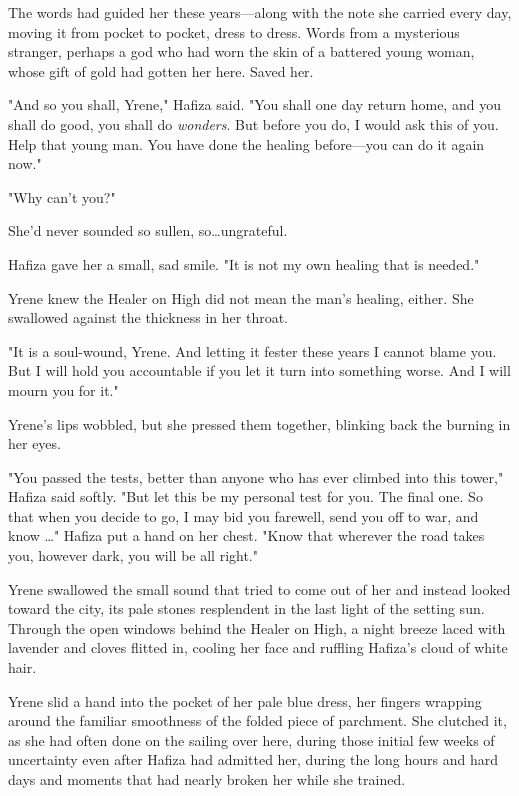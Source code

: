 The words had guided her these years---along with the note she carried every day, moving it from pocket to pocket, dress to dress. Words from a mysterious stranger, perhaps a god who had worn the skin of a battered young woman, whose gift of gold had gotten her here. Saved her.

"And so you shall, Yrene," Hafiza said. "You shall one day return home, and you shall do good, you shall do \emph{wonders}. But before you do, I would ask this of you. Help that young man. You have done the healing before---you can do it again now."

"Why can't you?"

She'd never sounded so sullen, so\ldots ungrateful.

Hafiza gave her a small, sad smile. "It is not my own healing that is needed."

Yrene knew the Healer on High did not mean the man's healing, either. She swallowed against the thickness in her throat.

"It is a soul-wound, Yrene. And letting it fester these years I cannot blame you. But I will hold you accountable if you let it turn into something worse. And I will mourn you for it."

Yrene's lips wobbled, but she pressed them together, blinking back the burning in her eyes.

"You passed the tests, better than anyone who has ever climbed into this tower," Hafiza said softly. "But let this be my personal test for you. The final one. So that when you decide to go, I may bid you farewell, send you off to war, and know \ldots" Hafiza put a hand on her chest. "Know that wherever the road takes you, however dark, you will be all right."

Yrene swallowed the small sound that tried to come out of her and instead looked toward the city, its pale stones resplendent in the last light of the setting sun. Through the open windows behind the Healer on High, a night breeze laced with lavender and cloves flitted in, cooling her face and ruffling Hafiza's cloud of white hair.

Yrene slid a hand into the pocket of her pale blue dress, her fingers wrapping around the familiar smoothness of the folded piece of parchment. She clutched it, as she had often done on the sailing over here, during those initial few weeks of uncertainty even after Hafiza had admitted her, during the long hours and hard days and moments that had nearly broken her while she trained.

